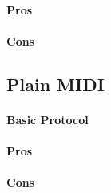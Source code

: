\documentclass[a4paper,10pt]{article}
\begin{document}
\begin{multicols}{2}
\paragraph{Pros}
\TODO


\paragraph{Cons}
\TODO


\subsection{Plain MIDI}

\TODO


\paragraph{Basic Protocol}
\TODO


\paragraph{Pros}
\TODO


\paragraph{Cons}
\TODO





\end{multicols}
\end{document}

